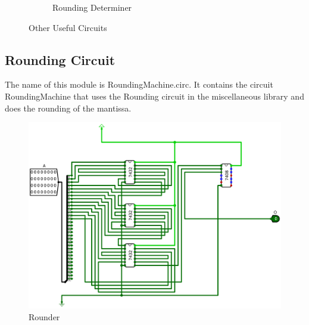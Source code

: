 \documentclass[12pt]{article}
\begin{document}
\begin{figure}[H]
\begin{subfigure}[b]{0.3\textwidth}
  \caption{Rounding Determiner}
  \label{fig:rounddet}
 \end{subfigure}
 \caption{Other Useful Circuits}\label{fig:other}
\end{figure}

\newpage
\subsection{Rounding Circuit}
The name of this module is RoundingMachine.circ. It contains the circuit RoundingMachine that uses the Rounding circuit in the miscellaneous library and does the rounding of the mantissa.
\begin{figure}[H]
    \centering
        \includegraphics[width=\textwidth]{Images/Rounding.png}
    \caption{Rounder}\label{fig:rounder}
\end{figure}

\newpage
\end{document}
